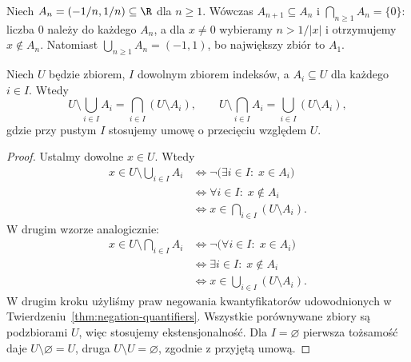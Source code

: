 \begin{przyklad}
Niech $A_n=(-1/n,1/n)\subseteq\R$ dla $n\ge1$.
Wówczas $A_{n+1}\subseteq A_n$ i
$\bigcap_{n\ge1}A_n=\{0\}$: liczba $0$ należy do każdego
$A_n$, a dla $x\ne0$ wybieramy $n>1/|x|$ i otrzymujemy
$x\notin A_n$. Natomiast
$\bigcup_{n\ge1}A_n=(-1,1)$, bo największy zbiór to $A_1$.
\end{przyklad}

\begin{twierdzenie}\label{thm:arbitrary-de-morgan}
Niech $U$ będzie zbiorem, $I$ dowolnym zbiorem indeksów,
a $A_i\subseteq U$ dla każdego $i\in I$. Wtedy
\[
U\setminus\bigcup_{i\in I}A_i
=\bigcap_{i\in I}(U\setminus A_i),\qquad
U\setminus\bigcap_{i\in I}A_i
=\bigcup_{i\in I}(U\setminus A_i),
\]
gdzie przy pustym $I$ stosujemy umowę o przecięciu względem $U$.
\end{twierdzenie}
\begin{proof}
Ustalmy dowolne $x\in U$. Wtedy
\begin{align*}
x\in U\setminus\bigcup_{i\in I}A_i
&\iff \neg\bigl(\exists i\in I:\;x\in A_i\bigr)\\
&\iff \forall i\in I:\;x\notin A_i\\
&\iff x\in\bigcap_{i\in I}(U\setminus A_i).
\end{align*}
W drugim wzorze analogicznie:
\begin{align*}
x\in U\setminus\bigcap_{i\in I}A_i
&\iff \neg\bigl(\forall i\in I:\;x\in A_i\bigr)\\
&\iff \exists i\in I:\;x\notin A_i\\
&\iff x\in\bigcup_{i\in I}(U\setminus A_i).
\end{align*}
W drugim kroku użyliśmy praw negowania kwantyfikatorów
udowodnionych w Twierdzeniu~\ref{thm:negation-quantifiers}. Wszystkie
porównywane zbiory są podzbiorami $U$, więc stosujemy ekstensjonalność.
Dla $I=\varnothing$ pierwsza tożsamość daje
$U\setminus\varnothing=U$, druga
$U\setminus U=\varnothing$, zgodnie z przyjętą umową.
\end{proof}

